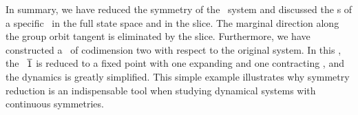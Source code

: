 In summary,
we have reduced the  symmetry of the \twomode\ system
and discussed the \Fv s of a specific \rpo\ in the full state space and in the
slice. The marginal direction along the group orbit tangent is eliminated by the
slice. Furthermore, we have constructed a \PoincSec\ of codimension two with
respect to the original system. In this \PoincSec, the \rpo\ ${\overline{1}}$
is reduced to a fixed point with
one expanding and one contracting \Fv, and the dynamics is
greatly simplified. This simple example illustrates why symmetry reduction
is an indispensable tool when studying dynamical systems with
continuous symmetries.

